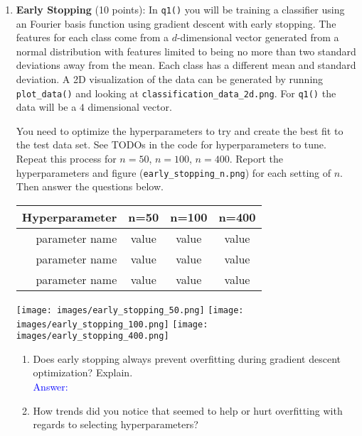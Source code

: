 \documentclass{article}
\begin{document}
\begin{enumerate}
    \item \textbf{Early Stopping} (10 points): In \texttt{q1()} you will be training a classifier using an Fourier basis function using gradient descent with early stopping. The features for each class come from a $d$-dimensional vector generated from a normal distribution with features limited to being no more than two standard deviations away from the mean. Each class has a different mean and standard deviation. A 2D visualization of the data can be generated by running \texttt{plot\_data()} and looking at \texttt{classification\_data\_2d.png}. For \texttt{q1()} the data will be a $4$ dimensional vector. 

    You need to optimize the hyperparameters to try and create the best fit to the test data set. See TODOs in the code for hyperparameters to tune. Repeat this process for $n=50$, $n=100$, $n=400$. Report the hyperparameters and figure (\texttt{early\_stopping\_n.png}) for each setting of $n$. Then answer the questions below. 

    \begin{table}[htbp]
    \centering
    \begin{tabular}{rccc}
    \multicolumn{1}{c}{Hyperparameter} &  n=50 & n=100 & n=400 \\ \hline
    parameter name          &  value  &  value  &  value   \\
    parameter name          &  value  &  value  &  value   \\
    parameter name          &  value  &  value  &  value   \\
    \hline
    \end{tabular}
    \end{table}
    \texttt{[image: images/early\_stopping\_50.png]}
    \texttt{[image: images/early\_stopping\_100.png]}
    \texttt{[image: images/early\_stopping\_400.png]}

    \begin{enumerate}
        \item Does early stopping always prevent overfitting during gradient descent optimization? Explain. \\
        
        \textcolor{blue}{Answer: }\\

        
        \item How trends did you notice that seemed to help or hurt overfitting with regards to selecting hyperparameters? \\
        

\end{enumerate}
\end{enumerate}
\end{document}
